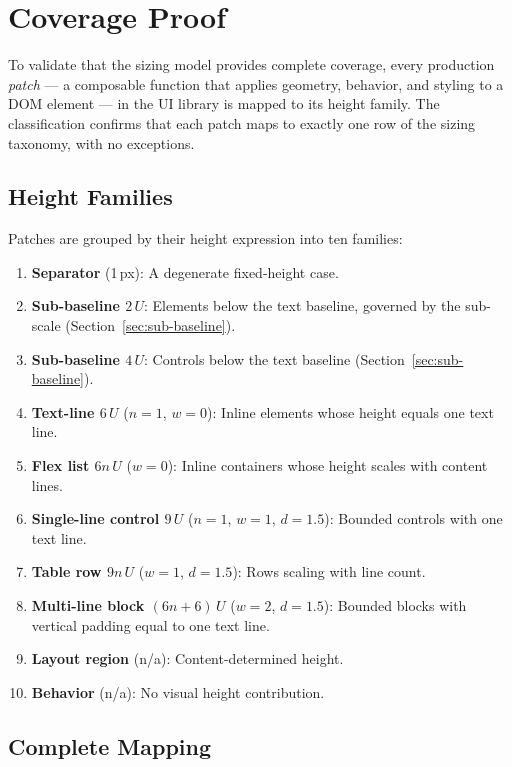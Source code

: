 \section{Coverage Proof}
\label{sec:dimension}

To validate that the sizing model provides complete coverage, every production \emph{patch} --- a composable function that applies geometry, behavior, and styling to a DOM element --- in the UI library is mapped to its height family. The classification confirms that each patch maps to exactly one row of the sizing taxonomy, with no exceptions.

\subsection{Height Families}

Patches are grouped by their height expression into ten families:

\begin{enumerate}
  \item \textbf{Separator} (1\,px): A degenerate fixed-height case.
  \item \textbf{Sub-baseline $2\,U$}: Elements below the text baseline, governed by the sub-scale (Section~\ref{sec:sub-baseline}).
  \item \textbf{Sub-baseline $4\,U$}: Controls below the text baseline (Section~\ref{sec:sub-baseline}).
  \item \textbf{Text-line $6\,U$} ($n = 1$, $w = 0$): Inline elements whose height equals one text line.
  \item \textbf{Flex list $6n\,U$} ($w = 0$): Inline containers whose height scales with content lines.
  \item \textbf{Single-line control $9\,U$} ($n = 1$, $w = 1$, $d = 1.5$): Bounded controls with one text line.
  \item \textbf{Table row $9n\,U$} ($w = 1$, $d = 1.5$): Rows scaling with line count.
  \item \textbf{Multi-line block $(6n + 6)\,U$} ($w = 2$, $d = 1.5$): Bounded blocks with vertical padding equal to one text line.
  \item \textbf{Layout region} (n/a): Content-determined height.
  \item \textbf{Behavior} (n/a): No visual height contribution.
\end{enumerate}

\subsection{Complete Mapping}


